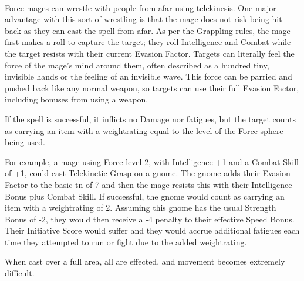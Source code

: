 \begin{multicols}{2}
\spelllevel

\\
Force mages can wrestle with people from afar using telekinesis. One major advantage with this sort of wrestling is that the mage does not risk being hit back as they can cast the spell from afar. As per the Grappling rules, the mage first makes a roll to capture the target; they roll Intelligence and Combat while the target resists with their current Evasion Factor. Targets can literally feel the force of the mage's mind around them, often described as a hundred tiny, invisible hands or the feeling of an invisible wave. This force can be parried and pushed back like any normal weapon, so targets can use their full Evasion Factor, including bonuses from using a weapon.

If the spell is successful, it inflicts no Damage nor \glspl{fatigue}, but the target counts as carrying an item with a \gls{weightrating} equal to the level of the Force sphere being used.

For example, a mage using Force level 2, with Intelligence +1 and a Combat Skill of +1, could cast Telekinetic Grasp on a gnome.
The gnome adds their Evasion Factor to the basic \gls{tn} of 7 and then the mage resists this with their Intelligence Bonus plus Combat Skill.
If successful, the gnome would count as carrying an item with a \gls{weightrating} of 2.
Assuming this gnome has the usual Strength Bonus of -2, they would then receive a -4 penalty to their effective Speed Bonus.
Their Initiative Score would suffer and they would accrue additional \glspl{fatigue} each time they attempted to run or fight due to the added \gls{weightrating}.

When cast over a full area, all are effected, and movement becomes extremely difficult.

\end{multicols}



